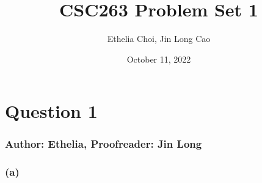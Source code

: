 \documentclass{article}
\title{CSC263 Problem Set 1}
\author{Ethelia Choi, Jin Long Cao}
\date{October 11, 2022}
\begin{document}
\maketitle

\section*{Question 1}
\subsubsection*{Author: Ethelia, Proofreader: Jin Long}
\subsubsection*{(a)} 
\end{document}
